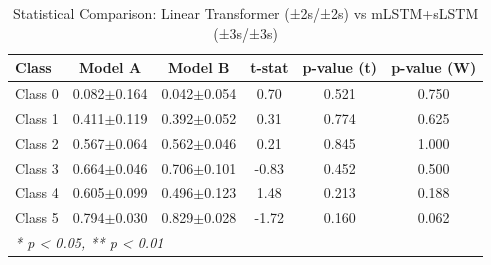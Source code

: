 \begin{table}[htbp]
\centering
\caption{Statistical Comparison: Linear Transformer (±2s/±2s) vs mLSTM+sLSTM (±3s/±3s)}
\label{tab:comparison_class_linear_transformer_±2s_±2s_vs_mlstmslstm_±3s_±3s}
\begin{tabular}{lccccc}
\toprule
\textbf{Class} & \textbf{Model A} & \textbf{Model B} & \textbf{t-stat} & \textbf{p-value (t)} & \textbf{p-value (W)} \\
\midrule
Class 0 & 0.082$\pm$0.164 & 0.042$\pm$0.054 & 0.70 & 0.521 & 0.750 \\
Class 1 & 0.411$\pm$0.119 & 0.392$\pm$0.052 & 0.31 & 0.774 & 0.625 \\
Class 2 & 0.567$\pm$0.064 & 0.562$\pm$0.046 & 0.21 & 0.845 & 1.000 \\
Class 3 & 0.664$\pm$0.046 & 0.706$\pm$0.101 & -0.83 & 0.452 & 0.500 \\
Class 4 & 0.605$\pm$0.099 & 0.496$\pm$0.123 & 1.48 & 0.213 & 0.188 \\
Class 5 & 0.794$\pm$0.030 & 0.829$\pm$0.028 & -1.72 & 0.160 & 0.062 \\
\bottomrule
\multicolumn{6}{l}{\textit{* p < 0.05, ** p < 0.01}} \\
\end{tabular}
\end{table}